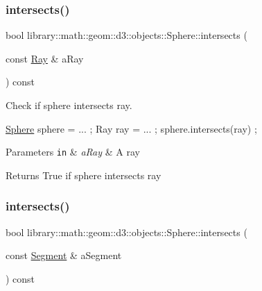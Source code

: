 \subsubsection{\texorpdfstring{intersects()}{intersects()}\hspace{0.1cm}{\footnotesize\ttfamily [4/8]}}
{\footnotesize\ttfamily bool library\+::math\+::geom\+::d3\+::objects\+::\+Sphere\+::intersects (\begin{DoxyParamCaption}\item[{const \hyperlink{classlibrary_1_1math_1_1geom_1_1d3_1_1objects_1_1_ray}{Ray} \&}]{a\+Ray }\end{DoxyParamCaption}) const}



Check if sphere intersects ray. 


\begin{DoxyCode}
\hyperlink{classlibrary_1_1math_1_1geom_1_1d3_1_1objects_1_1_sphere_a55dccc8ea16ee55cd7694c26afa8ea39}{Sphere} sphere = ... ;
Ray ray = ... ;
sphere.intersects(ray) ;
\end{DoxyCode}



\begin{DoxyParams}[1]{Parameters}
\mbox{\tt in}  & {\em a\+Ray} & A ray \\
\hline
\end{DoxyParams}
\begin{DoxyReturn}{Returns}
True if sphere intersects ray 
\end{DoxyReturn}
\mbox{\label{classlibrary_1_1math_1_1geom_1_1d3_1_1objects_1_1_sphere_af2ec8951ba63bd6718588e491213fddf}} 
\subsubsection{\texorpdfstring{intersects()}{intersects()}\hspace{0.1cm}{\footnotesize\ttfamily [5/8]}}
{\footnotesize\ttfamily bool library\+::math\+::geom\+::d3\+::objects\+::\+Sphere\+::intersects (\begin{DoxyParamCaption}\item[{const \hyperlink{classlibrary_1_1math_1_1geom_1_1d3_1_1objects_1_1_segment}{Segment} \&}]{a\+Segment }\end{DoxyParamCaption}) const}



